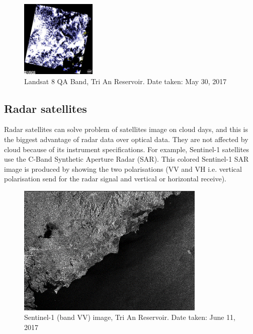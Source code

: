 \begin{figure}
	\centering
	\includegraphics[width=0.32\textwidth]{figures/qaL8.jpg}
	\caption{Landsat 8 QA Band, Tri An Reservoir. Date taken: May 30, 2017}
\end{figure}

\subsection{Radar satellites}

Radar satellites can solve problem of satellites image on cloud days, and this is the biggest advantage of radar data over optical data. They are not affected by cloud because of its instrument specifications. For example, Sentinel-1 satellites use the C-Band Synthetic Aperture Radar (SAR). This colored Sentinel-1 SAR image is produced by showing the two polarisations (VV and VH i.e. vertical polarisation send for the radar signal and vertical or horizontal receive). 

\begin{figure}[h!]
	\centering
	\includegraphics[width=0.8\textwidth]{figures/sarImgVVS1.png}
	\caption{Sentinel-1 (band VV) image, Tri An Reservoir. Date taken: June 11, 2017}
\end{figure}	


